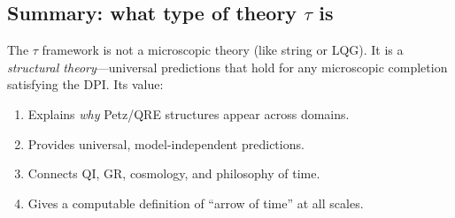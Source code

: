 \documentclass[aps,prd,preprint,superscriptaddress,longbibliography]{revtex4-2}
\newcommand{\tauasym}{\tau}
\begin{document}
\subsection{Summary: what type of theory $\tauasym$ is}

The $\tauasym$ framework is not a microscopic theory (like string or
LQG).  It is a \emph{structural theory}---universal predictions that
hold for any microscopic completion satisfying the DPI.  Its value:
\begin{enumerate}
\item Explains \emph{why} Petz/QRE structures appear across domains.
\item Provides universal, model-independent predictions.
\item Connects QI, GR, cosmology, and philosophy of time.
\item Gives a computable definition of ``arrow of time'' at all scales.
\end{enumerate}

\end{document}
